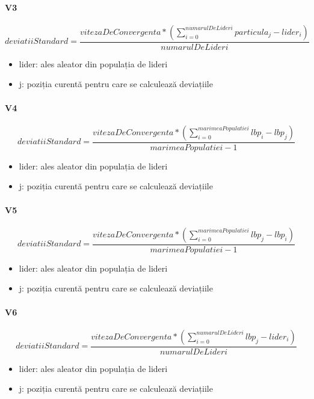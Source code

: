 \paragraph{V3}
\begin{equation}
    deviatiiStandard = \frac{vitezaDeConvergenta * (\sum_{i=0}^{numarulDeLideri}particula_j - lider_i)}{numarulDeLideri}
\end{equation}
\begin{itemize}
    \item lider: ales aleator din populația de lideri
    \item j: poziția curentă pentru care se calculează deviațiile
\end{itemize}
\paragraph{V4}
\begin{equation}
    deviatiiStandard = \frac{vitezaDeConvergenta * (\sum_{i=0}^{marimeaPopulatiei}lbp_i - lbp_j)}{marimeaPopulatiei - 1}
\end{equation}
\begin{itemize}
    \item lider: ales aleator din populația de lideri
    \item j: poziția curentă pentru care se calculează deviațiile
\end{itemize}
\paragraph{V5}
\begin{equation}
    deviatiiStandard = \frac{vitezaDeConvergenta * (\sum_{i=0}^{marimeaPopulatiei}lbp_j - lbp_i)}{marimeaPopulatiei - 1}
\end{equation}
\begin{itemize}
    \item lider: ales aleator din populația de lideri
    \item j: poziția curentă pentru care se calculează deviațiile
\end{itemize}
\paragraph{V6}
\begin{equation}
    deviatiiStandard = \frac{vitezaDeConvergenta * (\sum_{i=0}^{numarulDeLideri}lbp_j - lider_i)}{numarulDeLideri}
\end{equation}
\begin{itemize}
    \item lider: ales aleator din populația de lideri
    \item j: poziția curentă pentru care se calculează deviațiile
\end{itemize}
